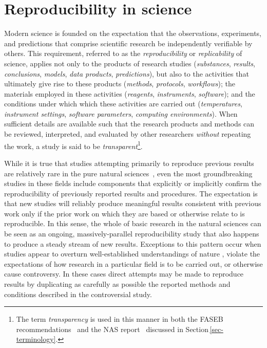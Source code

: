\section{Reproducibility in science}\label{sec-reproducibility}

Modern science is founded on the expectation that the observations, experiments, and
	predictions that comprise scientific research be independently verifiable by others.
This requirement, referred to as the \emph{reproducibility} or \emph{replicability} of
	science, applies not only to the products of research studies (\emph{substances},
	\emph{results}, \emph{conclusions}, \emph{models}, \emph{data products},
	\emph{predictions}), but also to the activities that ultimately give rise to these
	products (\emph{methods}, \emph{protocols}, \emph{workflows}); the materials
	employed in these activities (\emph{reagents}, \emph{instruments},
	\emph{software}); and the conditions
	under which which these activities are carried out (\emph{temperatures},
	\emph{instrument settings}, \emph{software parameters},
	\emph{computing environments}).  When sufficient details are available
	such that the research products and methods can be reviewed, interpreted, and
	evaluated by other researchers \emph{without} repeating the work, a study is said to be
	\emph{transparent}\footnote{The term \emph{transparency} is used in this manner
	in both the FASEB recommendations~\cite{FASEB2016enhancing}
   and the NAS report~\cite{committeeonreproducibilityandreplicabilityinscience2019reproducibility}
	discussed in Section\,\ref{sec-terminology}.}.

While it is true that studies attempting primarily to reproduce previous results are relatively rare in the
	pure natural sciences~\cite{collins_changing_1985}, even the most groundbreaking studies in these fields include components
	that explicitly or implicitly confirm the reproducibility of previously reported results and procedures.
The expectation is that new studies will reliably produce meaningful results consistent with previous work
	only if the prior work on which they are based or otherwise relate to is reproducible.
In this sense, the whole of basic research in the natural sciences can be seen as an ongoing, massively-parallel
	reproducibility study that also happens to produce a steady stream of new results.
Exceptions to this pattern occur when studies appear to overturn
well-established understandings of nature \cite{kuhn1962structure},
	violate the expectations of how research in a particular field is to be carried out, or otherwise cause controversy.
In these cases direct attempts may be made to reproduce results by duplicating as carefully as possible
	the reported methods and conditions described in the controversial study.

